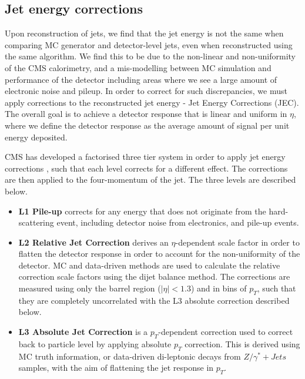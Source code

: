 \subsection{Jet energy corrections} \label{subsec-JEC}

Upon reconstruction of jets, we find that the jet energy is not the same when comparing MC generator and detector-level jets, even when reconstructed using the same algorithm. We find this to be due to the non-linear and non-uniformity of the CMS calorimetry, and a mis-modelling between MC simulation and performance of the detector including areas where we see a large amount of electronic noise and pileup. In order to correct for such discrepancies, we must apply corrections to the reconstructed jet energy - Jet Energy Corrections (JEC). The overall goal is to achieve a detector response that is linear and uniform in $\eta$, where we define the detector response as the average amount of signal per unit energy deposited.

CMS has developed a factorised three tier system in order to apply jet energy corrections \cite{1742-6596-404-1-012014}, such that each level corrects for a different effect. The corrections are then applied to the four-momentum of the jet. The three levels are described below.

\begin{itemize}
	\item \textbf{L1 Pile-up} corrects for any energy that does not originate from the hard-scattering event, including detector noise from electronics, and pile-up events.
	\item \textbf{L2 Relative Jet Correction} derives an $\eta$-dependent scale factor in order to flatten the detector response in order to account for the non-uniformity of the detector. MC and data-driven methods are used to calculate the relative correction scale factors using the dijet balance method. The corrections are measured using only the barrel region ($|\eta| < 1.3$) and in bins of $p_T$, such that they are completely uncorrelated with the L3 absolute correction described below. 
	\item \textbf{L3 Absolute Jet Correction} is a $p_T$-dependent correction used to correct back to particle level by applying absolute $p_T$ correction. This is derived using MC truth information, or data-driven di-leptonic decays from $Z/\gamma^*+Jets$ samples, with the aim of flattening the jet response in $p_T$. 
\end{itemize} 

